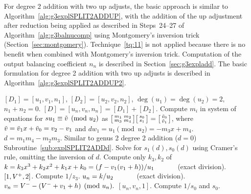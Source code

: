 For degree 2 addition with two up adjusts, the basic approach is similar to
Algorithm~\ref{alg:g3explSPLIT2ADDUP}, with the addition of the up adjustment
after reduction being applied as described in Steps~24--27 of
Algorithm~\ref{alg:g3balnucomp} using Montgomery's inversion trick
(Section~\ref{sec:montgomery}). Technique~\ref{tq:11} is not applied because
there is no benefit when combined with Montgomery's inversion trick.
Computation of the output balancing coefficient $n_n$ is described in
Section~\ref{sec:g3expladd}. The basic formulation for degree 2 addition with
two up adjusts is described in Algorithm~\ref{alg:g3explSPLIT2ADDUP2}.


\begin{algorithm}[H]
\caption{Genus 3 Split Model Degree 2 Addition with Two Up Adjusts\label{alg:g3explSPLIT2ADDUP2}}
\begin{algorithmic} [1]
\Require $[D_1] = [u_1,v_1,n_1]$, $[D_2] = [u_2,v_2,n_2]$, $\deg(u_1) = \deg(u_2) = 2$, $n_1 + n_2 = 0$.
\Ensure $[D] = [u_n,v_n,n_n] = [D_1] + [D_2] $.
\algrule
\vspace{-2pt}
\State Compute $m_i$ in system of equations for $su_1\equiv \tilde{v} \pmod{u_2}$ as $ \bigl[ \begin{smallmatrix} m_1 & m_2\\ m_3 & m_4\end{smallmatrix}\bigr] \bigl[ \begin{smallmatrix} s_0\\ s_1 \end{smallmatrix} \bigr ] = \bigl[ \begin{smallmatrix}\tilde{v}_0 \\  \tilde{v}_1\end{smallmatrix} \bigr ]$, where $\tilde{v} = \tilde{v}_1x + \tilde{v}_0 = v_2 - v_1$ and $dw_1 = u_1 \pmod{u_2} = -m_3x + m_4$.
\State $d = m_1m_4 - m_2m_3$.
    \State Similar to genus 2 degree 2 addition ($d=0$) Subroutine~\ref{sub:explSPLIT2ADDd}.
\EndIf
\State Solve for $s_1(d), s_0(d)$ using Cramer's rule, omitting the inversion of $d$.
\State Compute only $k_3, k_2$ of $k = k_3x^3 + k_2x^2 + k_1x + k_0 = (f - v_1(v_1 + h))/u_1 \quad\quad\quad$ (exact division).  
         \Return $[1,V^{+},2]$.
        \Else \hspace{3pt} Compute $1/z_3$.
            \State $u_n = k/u_2 \quad\quad\quad$ (exact division).
            \State $v_n = V^{-} - (V^{-} + v_1 + h) \pmod{u_n}.$
            \State \Return $[u_n,v_n,1]$.
        \EndIf
    \Else \hspace{3pt} Compute $1/s_0$ and $s_0$.

\end{algorithmic}
\end{algorithm}
